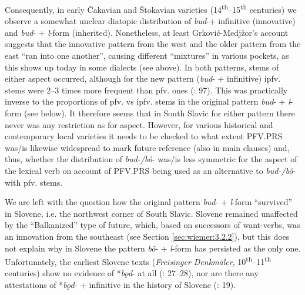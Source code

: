 \documentclass[output=paper,colorlinks,citecolor=brown]{langscibook}
\begin{document}
Consequently, in early Čakavian and Štokavian varieties (14\textsuperscript{th}--15\textsuperscript{th} centuries) we observe a somewhat unclear diatopic distribution of \textit{bud}-+ infinitive (innovative) and \textit{bud}- + \textit{l}-form (inherited). Nonetheless, at least Grković-Medjžor’s account suggests that the innovative pattern from the west and the older pattern from the east “ran into one another”, causing different “mixtures” in various pockets, as this shows up today in some dialects (see above). In both patterns, stems of either aspect occurred, although for the new pattern (\textit{bud}- + infinitive) ipfv. stems were 2--3 times more frequent than pfv. ones (\cite{Grković-Mejdžor2012}: 97). This was practically inverse to the proportions of pfv. vs ipfv. stems in the original pattern \textit{bud}- + \textit{l}-form (see below). It therefore seems that in South Slavic for either pattern there never was any restriction as for aspect. However, for various historical and contemporary local varieties it needs to be checked to what extent PFV.PRS was/is likewise widespread to mark future reference (also in main clauses) and, thus, whether the distribution of \textit{bud-/bô}- was/is less symmetric for the aspect of the lexical verb on account of PFV.PRS being used as an alternative to \textit{bud-/bô}- with pfv. stems.

We are left with the question how the original pattern \textit{bud}- + \textit{l}-form “survived” in Slovene, i.e. the northwest corner of South Slavic. Slovene remained unaffected by the “Balkanized” type of future, which, based on successors of want-verbs, was an innovation from the southeast (see Section \ref{sec:wiemer:3.2.2}), but this does not explain why in Slovene the pattern \textit{bô}- + \textit{l}-form has persisted as the only one. Unfortunately, the earliest Slovene texts (\textit{Freisinger Denkmäler}, 10\textsuperscript{th}--11\textsuperscript{th} centuries) show no evidence of *\textit{bǫd}- at all (\cite{Whaley2000}: 27--28), nor are there any attestations of *\textit{bǫd}- + infinitive in the history of Slovene (\cite{andersen_2006b}: 19). 



\label{sec:wiemer:3.2.1.2}
\end{document}
